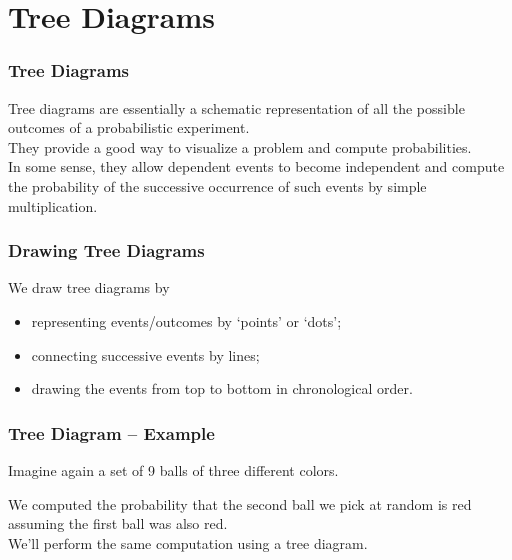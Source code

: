 \documentclass[aspectratio=169,11pt,usenames,dvipsnames]{beamer}
\newcommand{\clr}{\textcolor{BrickRed}}
\begin{document}
\section{Tree Diagrams}

\begin{frame}
 \frametitle{Tree Diagrams}
 \alert{Tree diagrams} are essentially a schematic representation of all the
 possible outcomes of a probabilistic experiment.\\
 \pause
 They provide a good way to visualize a problem and compute probabilities.\\
 \pause
 In some sense, they allow \alert{dependent events} to \alert{become
 independent} and compute the probability of the successive occurrence of such
 events by simple multiplication.
\end{frame}

\begin{frame}
 \frametitle{Drawing Tree Diagrams}
 We draw tree diagrams by
 \begin{itemize}
  \item representing events/outcomes by `points' or `dots';
  \pause
  \item connecting successive events by lines;
   \pause
  \item drawing the events from top to bottom in chronological order.
 \end{itemize}
\end{frame}

\begin{frame}
 \frametitle{Tree Diagram -- Example}
 Imagine again a set of 9 balls of three different colors.
 \begin{center}
 \end{center}
 \pause
 We computed the probability that the \alert{second} ball we pick at random is
 \clr{red} assuming the first ball was also \clr{red}.\\
 \pause
 We'll perform the same computation using a \alert{tree diagram}.
\end{frame}
\end{document}
